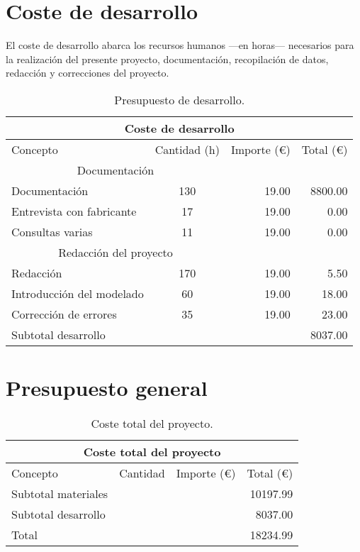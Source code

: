 \chapter{Coste de desarrollo}
El coste de desarrollo abarca los recursos humanos —en horas— necesarios para la realización del presente proyecto, documentación, recopilación de datos, redacción y correcciones del proyecto.

\begin{table}[!htb]
\centering
\begin{tabular}{lcrr}
\toprule
\multicolumn{4}{c}{Coste de desarrollo}\\
\midrule
Concepto & Cantidad (h) & Importe (\euro) & Total (\euro)\\
\midrule
\multicolumn{2}{c}{Documentación}\\
\cmidrule(r){1-2}
Documentación & 130 & 19.00 & 8800.00\\
Entrevista con fabricante & 17 & 19.00 & 0.00\\
Consultas varias & 11 & 19.00 & 0.00\\
\multicolumn{2}{c}{Redacción del proyecto}\\
\cmidrule(r){1-2}
Redacción & 170 & 19.00 & 5.50\\
Introducción del modelado & 60 & 19.00 & 18.00\\
Corrección de errores & 35 & 19.00 & 23.00\\
\bottomrule
Subtotal desarrollo & & & 8037.00\\
\bottomrule
\end{tabular}
\caption{Presupuesto de desarrollo.}
\label{presupuestodesarrollo}
\end{table}

\chapter{Presupuesto general}

\begin{table}[!htb]
\centering
\begin{tabular}{lcrr}
\toprule
\multicolumn{4}{c}{Coste total del proyecto}\\
\midrule
Concepto & Cantidad & Importe (\euro) & Total (\euro)\\
\midrule
Subtotal materiales & & & 10197.99\\
Subtotal desarrollo & & & 8037.00\\
\bottomrule
Total & & & 18234.99\\
\bottomrule
\end{tabular}
\caption{Coste total del proyecto.}
\label{presupuestototal}
\end{table}

